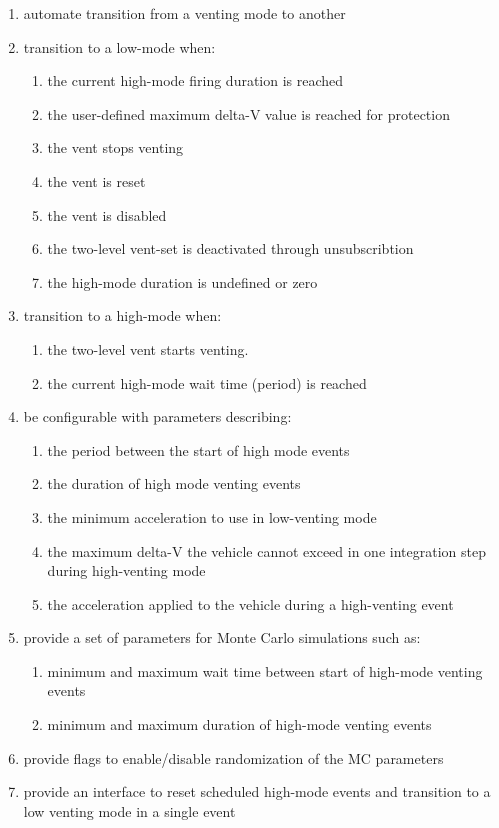 \documentclass[11pt,fleqn]{report}
\begin{document}
\begin{enumerate}[noitemsep]
\begin{enumerate}
            \item automate transition from a venting mode to another 
            \item transition to a low-mode when:
            \begin{enumerate}
                \item the current high-mode firing duration is reached
                \item the user-defined maximum delta-V value is reached for protection
                \item the vent stops venting
                \item the vent is reset
                \item the vent is disabled
                \item the two-level vent-set is deactivated through unsubscribtion
                \item the high-mode duration is undefined or zero
            \end{enumerate}
            \item transition to a high-mode when:
            \begin{enumerate}
                \item the two-level vent starts venting.
                \item the current high-mode wait time (period) is reached
            \end{enumerate}
            \item be configurable with parameters describing:
            \begin{enumerate}
                \item the period between the start of high mode events
                \item the duration of high mode venting events
                \item the minimum acceleration to use in low-venting mode
                \item the maximum delta-V the vehicle cannot exceed in one integration step during high-venting mode
                \item the acceleration applied to the vehicle during a high-venting event
            \end{enumerate}
            \item provide a set of parameters for Monte Carlo simulations such as:
            \begin{enumerate}
                \item minimum and maximum wait time between start of high-mode venting events
                \item minimum and maximum duration of high-mode venting events
            \end{enumerate}
            \item provide flags to enable/disable randomization of the MC parameters
            \item provide an interface to reset scheduled high-mode events and transition to a low venting mode in a single event
        \end{enumerate}
\end{enumerate}
\end{document}
